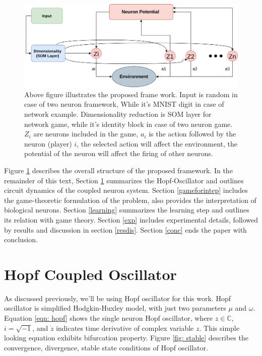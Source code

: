\documentclass{article}
\begin{document}
\begin{figure}
 \centering
 \includegraphics[width=1\textwidth]{overview.png}
 \caption{Above figure illustrates the proposed frame work. Input is random in case of two neuron framework, While it's MNIST digit in case of network example. Dimensionality reduction is SOM layer for network game, while it's identity block in case of two neuron game. ${Z_i}$ are neurons included in the game, $a_i$ is the action followed by the neuron (player) $i$, the selected action will affect the environment, the potential of the neuron will affect the firing of other neurons.}
 \label{fig: overview}
\end{figure}

Figure \ref{fig: overview} describes the overall structure of the proposed framework. In the remainder of this text, Section \ref{hpfosc} summarizes the Hopf-Oscillator and outlines circuit dynamics of the coupled neuron system. Section \ref{gameforintep} includes the game-theoretic formulation of the problem, also provides the interpretation of biological neurons. Section \ref{learning} summarizes the learning step and outlines its relation with game theory. Section \ref{exp} includes experimental details, followed by results and discussion in section \ref{resdis}. Section \ref{conc} ends the paper with conclusion.

\section{Hopf Coupled Oscillator}
\label{hpfosc}

As discussed previously, we'll be using Hopf oscillator for this work. Hopf oscillator is simplified Hodgkin-Huxley model, with just two parameters $\mu$ and $\omega$. Equation \ref{eqn: hopf} shows the single neuron Hopf oscillator, where $z \in \mathbb{C}$, $i = \sqrt{-1}$, and $\dot{z}$ indicates time derivative of complex variable $z$. This simple looking equation exhibits bifurcation property. Figure \ref{fig: stable} describes the convergence, divergence, stable state conditions of Hopf oscillator.
\end{document}
